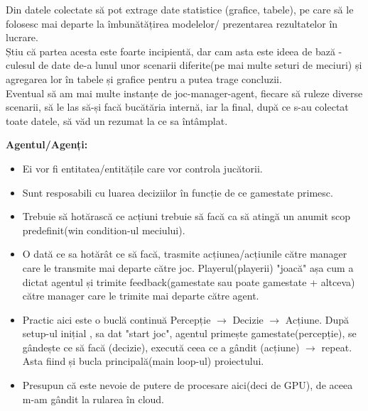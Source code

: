 \documentclass[12pt]{article}
\begin{document}
\begin{itemize}
    Din datele colectate să pot extrage date statistice (grafice, tabele), pe care să le folosesc mai departe la îmbunătățirea modelelor/ prezentarea rezultatelor în lucrare.\\
    Știu că partea acesta este foarte incipientă, dar cam asta este ideea de bază - culesul de date de-a lunul unor scenarii diferite(pe mai multe seturi de meciuri) și agregarea lor în tabele și grafice pentru a putea trage concluzii.\\
    Eventual să am mai multe instanțe de joc-manager-agent, fiecare să ruleze diverse scenarii, să le las să-și facă bucătăria internă, iar la final, după ce s-au colectat toate datele, să văd un rezumat la ce sa întâmplat.
\end{itemize}

\textbf{Agentul/Agenți:}
\begin{itemize}
    \item Ei vor fi entitatea/entitățile care vor controla jucătorii.
    \item Sunt resposabili cu luarea deciziilor în funcție de ce gamestate primesc.
    \item Trebuie să hotărască ce acțiuni trebuie să facă ca să atingă un anumit scop predefinit(win condition-ul meciului).
    \item O dată ce sa hotărât ce să facă, trasmite acțiunea/acțiunile către manager care le transmite mai departe către joc. Playerul(playerii) "joacă" așa cum a dictat agentul și trimite feedback(gamestate sau poate gamestate + altceva) către manager care le trimite mai departe către agent.
    \item Practic aici este o buclă continuă Percepție $\rightarrow$ Decizie $\rightarrow$ Acțiune. După setup-ul inițial , sa dat "start joc", agentul primește gamestate(percepție), se gândește ce să facă (decizie), execută ceea ce a gândit (acțiune) $\rightarrow$ repeat. Asta fiind și bucla principală(main loop-ul) proiectului.
    \item Presupun că este nevoie de putere de procesare aici(deci de GPU), de aceea m-am gândit la rularea în cloud.
\end{itemize}
\end{document}
